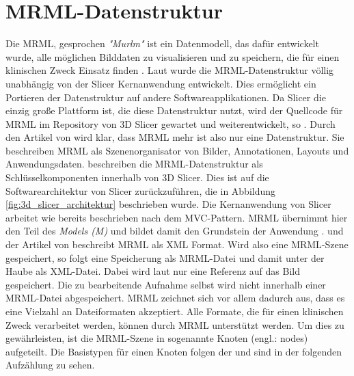 \section{MRML-Datenstruktur}
\label{subsec:mrml_datenstruktur} Die \ac{MRML}, gesprochen \textit{"Murlm"} ist
ein Datenmodell, das dafür entwickelt wurde, alle möglichen Bilddaten zu visualisieren
und zu speichern, die für einen klinischen Zweck Einsatz finden \citep[vgl.][]{slicer2024}.
Laut \citet{slicer2024} wurde die \ac{MRML}-Datenstruktur völlig unabhängig von
der Slicer Kernanwendung entwickelt. Dies ermöglicht ein Portieren der Datenstruktur
auf andere Softwareapplikationen. Da Slicer die einzig große Plattform ist, die diese
Datenstruktur nutzt, wird der Quellcode für \ac{MRML} im Repository von 3D Slicer
gewartet und weiterentwickelt, so \citet{slicer2024}. Durch den Artikel von
\citet[S.~1331]{fedorov2012slicer} wird klar, dass \ac{MRML} mehr ist also nur eine
Datenstruktur. Sie beschreiben \ac{MRML} als Szenenorganisator von Bilder,
Annotationen, Layouts und Anwendungsdaten. \citet[S.~1327]{fedorov2012slicer} beschreiben
die \ac{MRML}-Datenstruktur als Schlüsselkomponenten innerhalb von 3D Slicer. Dies
ist auf die Softwarearchitektur von Slicer zurückzuführen, die in Abbildung
\ref{fig:3d_slicer_architektur} beschrieben wurde. Die Kernanwendung von Slicer arbeitet
wie bereits beschrieben nach dem \ac{MVC}-Pattern. \ac{MRML} übernimmt hier den
Teil des \textit{Models (M)} und bildet damit den Grundstein der Anwendung \citep[vgl.][S.~1332]{fedorov2012slicer}.
\citet{slicer2024} und der Artikel von \citet[S.~1327]{fedorov2012slicer} beschreibt
\ac{MRML} als \ac{XML} Format. Wird also eine \ac{MRML}-Szene gespeichert, so
folgt eine Speicherung als \ac{MRML}-Datei und damit unter der Haube als \ac{XML}-Datei.
Dabei wird laut \citet{slicer2024} nur eine Referenz auf das Bild gespeichert. Die
zu bearbeitende Aufnahme selbst wird nicht innerhalb einer \ac{MRML}-Datei
abgespeichert. \ac{MRML} zeichnet sich vor allem dadurch aus, dass es eine Vielzahl
an Dateiformaten akzeptiert. Alle Formate, die für einen klinischen Zweck verarbeitet
werden, können durch \ac{MRML} unterstützt werden. Um dies zu gewährleisten, ist
die \ac{MRML}-Szene in sogenannte Knoten (engl.: nodes) aufgeteilt. Die Basistypen
für einen Knoten folgen der \citet{slicer2024} und sind in der folgenden
Aufzählung zu sehen.

